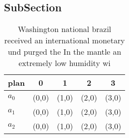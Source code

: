 \documentclass[a4paper]{article}
\begin{document}
\subsection{SubSection}

\begin{table}
\begin{adjustbox}{width=0.7\columnwidth}
\begin{tabular}{|l|l|l|l|l|}
\hline
\textbf{plan} & \multicolumn{1}{c|}{\textbf{0}} & \multicolumn{1}{c|}{\textbf{1}} & \multicolumn{1}{c|}{\textbf{2}} & \multicolumn{1}{c|}{\textbf{3}} \\ \hline
\textbf{$a_0$}  & (0,0) & (1,0) & (2,0) & (3,0) \\ \hline
\textbf{$a_1$}  & (0,0) & (1,0) & (2,0) & (3,0) \\ \hline
\textbf{$a_2$}  & (0,0) & (1,0) & (2,0) & (3,0) \\ \hline
\end{tabular}
\end{adjustbox}
\caption{Washington national brazil received an international monetary und purged the In the mantle an extremely low humidity wi
}
\end{table}
\end{document}
